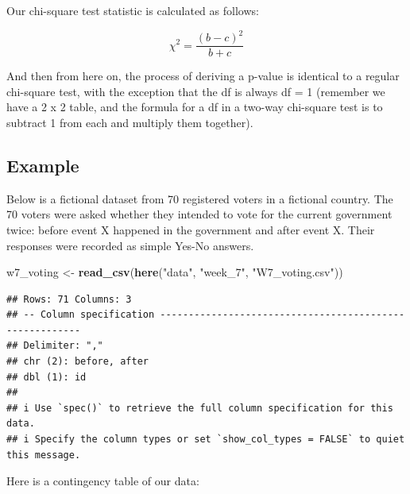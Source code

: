 \documentclass[
]{book}
\newenvironment{Shaded}{\begin{snugshade}}{\end{snugshade}}
\newcommand{\FunctionTok}[1]{\textcolor[rgb]{0.13,0.29,0.53}{\textbf{#1}}}
\newcommand{\NormalTok}[1]{#1}
\newcommand{\OtherTok}[1]{\textcolor[rgb]{0.56,0.35,0.01}{#1}}
\newcommand{\SpecialCharTok}[1]{\textcolor[rgb]{0.81,0.36,0.00}{\textbf{#1}}}
\newcommand{\StringTok}[1]{\textcolor[rgb]{0.31,0.60,0.02}{#1}}
\begin{document}
Our chi-square test statistic is calculated as follows:

\[
\chi^2 = \frac{(b-c)^2}{b+c}
\]

And then from here on, the process of deriving a p-value is identical to a regular chi-square test, with the exception that the df is always df = 1 (remember we have a 2 x 2 table, and the formula for a df in a two-way chi-square test is to subtract 1 from each and multiply them together).

\hypertarget{example-1}{%
\subsection{Example}\label{example-1}}

Below is a fictional dataset from 70 registered voters in a fictional country. The 70 voters were asked whether they intended to vote for the current government twice: before event X happened in the government and after event X. Their responses were recorded as simple Yes-No answers.

\begin{Shaded}
\begin{Highlighting}[]
\NormalTok{w7\_voting }\OtherTok{\textless{}{-}} \FunctionTok{read\_csv}\NormalTok{(}\FunctionTok{here}\NormalTok{(}\StringTok{"data"}\NormalTok{, }\StringTok{"week\_7"}\NormalTok{, }\StringTok{"W7\_voting.csv"}\NormalTok{))}
\end{Highlighting}
\end{Shaded}

\begin{verbatim}
## Rows: 71 Columns: 3
## -- Column specification --------------------------------------------------------
## Delimiter: ","
## chr (2): before, after
## dbl (1): id
## 
## i Use `spec()` to retrieve the full column specification for this data.
## i Specify the column types or set `show_col_types = FALSE` to quiet this message.
\end{verbatim}

Here is a contingency table of our data:

\begin{Shaded}
\end{Shaded}
\end{document}
